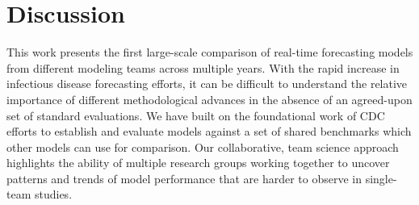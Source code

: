 \documentclass{article}\usepackage[]{graphicx}\usepackage[]{color}
\begin{document}
% 






\section*{Discussion}

This work presents the first large-scale comparison of real-time forecasting models from different modeling teams across multiple years.
With the rapid increase in infectious disease forecasting efforts, it can be difficult to understand the relative importance of different methodological advances in the absence of an agreed-upon set of standard evaluations.
We have built on the foundational work of CDC efforts to establish and evaluate models against a set of shared benchmarks which other models can use for comparison.
Our collaborative, team science approach highlights the ability of multiple research groups working together to uncover patterns and trends of model performance that are harder to observe in single-team studies.
\end{document}

